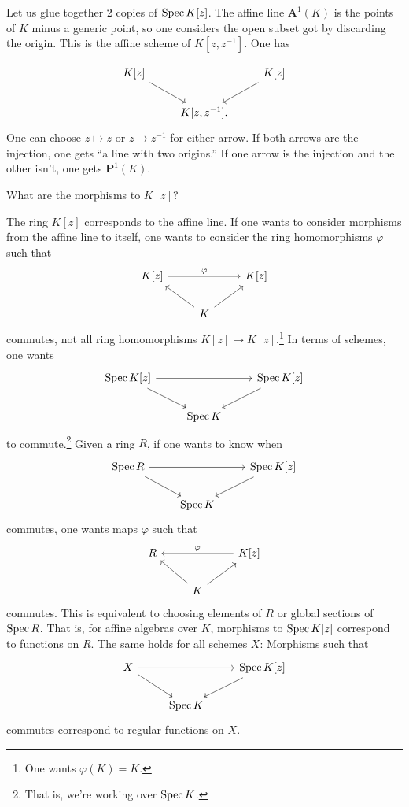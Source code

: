 \documentclass [11 pt, oneside] {article}
\begin{document}
\begin{example}[ ]\label{gluing_1}\text{}
Let us glue together $2$ copies of $\operatorname{Spec} K[z]$. The affine line $\mathbf{A}^1(K)$ is the points of $K$ minus a generic point, so one considers the open subset got by discarding the origin. This is the affine scheme of $K[z,z^{-1}]$. One has

\[
\begin{tikzcd}
	K[z]\ar[dr] && K[z] \ar[dl]\\
		    &K[z,z^{-1}].
\end{tikzcd}
\]
One can choose $z\longmapsto z$ or $z\longmapsto z^{-1}$ for either arrow. If both arrows are the injection, one gets ``a line with two origins.'' If one arrow is the injection and the other isn't, one gets $\mathbf{P}^1(K)$.
\end{example}

\begin{problem}
	What are the morphisms to $K[z]$?
\end{problem}

The ring $K[z]$ corresponds to the affine line. If one wants to consider morphisms from the affine line to itself, one wants to consider the ring homomorphisms $\varphi$ such that
\[
\begin{tikzcd}
	K[z] \ar[rr, "\varphi"] &&K[z] \\
			       &K\ar[lu] \ar[ru]
\end{tikzcd}
\]
commutes, not all ring homomorphisms $K[z] \longrightarrow K[z]$.\footnote{One wants $\varphi(K)=K$.} In terms of schemes, one wants
\[
\begin{tikzcd}
	\Spec K[z] \ar[dr] \ar[rr] &&\Spec K[z] \ar[dl]\\
				   &\Spec K
\end{tikzcd}
\]
to commute.\footnote{That is, we're working over $\operatorname{Spec} K$.} Given a ring $R$, if one wants to know when
\[
\begin{tikzcd}
\Spec R \ar[dr] \ar[rr] &&\Spec K[z] \ar[dl]\\
                                   &\Spec K	
\end{tikzcd}
\]
commutes, one wants maps $\varphi$ such that
\[
\begin{tikzcd}
	R && K[z] \ar[ll,  "\varphi",  swap] \\
	  &K \ar[ul]\ar[ur]
\end{tikzcd}
\]
commutes. This is equivalent to choosing elements of $R$ or global sections of $\operatorname{Spec} R$. That is, for affine algebras over $K$, morphisms to $\operatorname{Spec} K[z]$ correspond to functions on $R$. The same holds for all schemes $X$: Morphisms such that
\[
\begin{tikzcd}
	X \ar[dr] \ar[rr] &&\Spec K[z] \ar[dl]\\
                                   &\Spec K    
\end{tikzcd}
\]
commutes correspond to regular functions on $X$.
\end{document}
